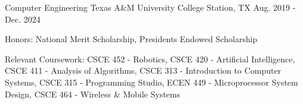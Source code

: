 

\begin{cventries}

  \cventry
    {Computer Engineering}
    {Texas A\&M University} %
    {College Station, TX} %
    {Aug. 2019 - Dec. 2024} %
    {
      \begin{cvitems} %
        \item {Honors: National Merit Scholarship, Presidents Endowed Scholarship}
        \item {Relevant Coursework: CSCE 452 - Robotics, CSCE 420 - Artificial Intelligence, CSCE 411 - Analysis of Algorithms, CSCE 313 - Introduction to Computer Systems, CSCE 315 - Programming Studio, ECEN 449 - Microprocessor System Design, CSCE 464 - Wireless \& Mobile Systems}
      \end{cvitems}
    }

\end{cventries}
